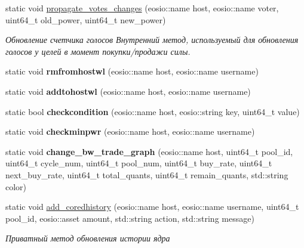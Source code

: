 \begin{DoxyCompactItemize}
static void \mbox{\hyperlink{classeosio_1_1unicore_a109b4a1d03b051e6d42a746d245ece71}{propagate\+\_\+votes\+\_\+changes}} (eosio\+::name host, eosio\+::name voter, uint64\+\_\+t old\+\_\+power, uint64\+\_\+t new\+\_\+power)
\begin{DoxyCompactList}\small\item\em Обновление счетчика голосов Внутренний метод, используемый для обновления голосов у целей в момент покупки/продажи силы. \end{DoxyCompactList}\item 
\mbox{\label{classeosio_1_1unicore_a2621edaa340a06b0b3140ed1e665aced}} 
static void {\bfseries rmfromhostwl} (eosio\+::name host, eosio\+::name username)
\item 
\mbox{\label{classeosio_1_1unicore_af839961f3a9b1b4b0a2a72c4da80b29e}} 
static void {\bfseries addtohostwl} (eosio\+::name host, eosio\+::name username)
\item 
\mbox{\label{classeosio_1_1unicore_af38098cad77812962d2f3190af29b222}} 
static bool {\bfseries checkcondition} (eosio\+::name host, eosio\+::string key, uint64\+\_\+t value)
\item 
\mbox{\label{classeosio_1_1unicore_a69f4801c22f9f2c828f5bf8d9170faaa}} 
static void {\bfseries checkminpwr} (eosio\+::name host, eosio\+::name username)
\item 
\mbox{\label{classeosio_1_1unicore_adaef461ff857e01e793f9d8900963f2e}} 
static void {\bfseries change\+\_\+bw\+\_\+trade\+\_\+graph} (eosio\+::name host, uint64\+\_\+t pool\+\_\+id, uint64\+\_\+t cycle\+\_\+num, uint64\+\_\+t pool\+\_\+num, uint64\+\_\+t buy\+\_\+rate, uint64\+\_\+t next\+\_\+buy\+\_\+rate, uint64\+\_\+t total\+\_\+quants, uint64\+\_\+t remain\+\_\+quants, std\+::string color)
\item 
\mbox{\label{classeosio_1_1unicore_a46aeb03b30648b83f0b653b3bcb877a2}} 
static void \mbox{\hyperlink{classeosio_1_1unicore_a46aeb03b30648b83f0b653b3bcb877a2}{add\+\_\+coredhistory}} (eosio\+::name host, eosio\+::name username, uint64\+\_\+t pool\+\_\+id, eosio\+::asset amount, std\+::string action, std\+::string message)
\begin{DoxyCompactList}\small\item\em Приватный метод обновления истории ядра \end{DoxyCompactList}\item 

\end{DoxyCompactItemize}
